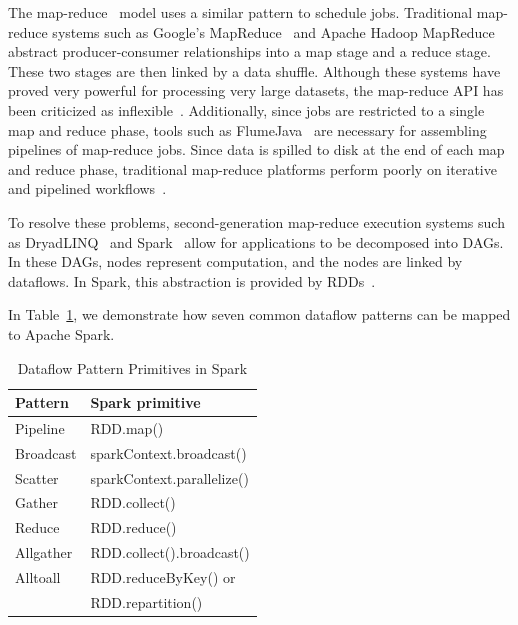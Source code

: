 \documentclass[10pt,journal,compsoc]{IEEEtran}
\begin{document}
The map-reduce~\cite{dean04} model uses a similar pattern to schedule jobs. Traditional map-reduce
systems such as Google's MapReduce~\cite{dean04} and Apache Hadoop MapReduce~\cite{HADOOP} 
abstract producer-consumer relationships into a map stage and a reduce stage. These two stages are then
linked by a data shuffle. Although these systems have proved very powerful for processing very
large datasets, the map-reduce API has been criticized as inflexible~\cite{dewitt08}.
Additionally, since jobs are restricted to a single map and reduce phase, tools such as
FlumeJava~\cite{chambers10} are necessary for assembling pipelines of map-reduce jobs. Since
data is spilled to disk at the end of each map and reduce phase, traditional map-reduce platforms perform poorly
on iterative and pipelined workflows~\cite{zaharia12}.

To resolve these problems, second-generation map-reduce execution systems such as
DryadLINQ~\cite{yu08} and Spark~\cite{zaharia12} allow for applications to be decomposed into
DAGs. In these DAGs, nodes represent computation, and the nodes are
linked by dataflows. In Spark, this abstraction is provided by RDDs~\cite{zaharia12}.

In Table~\ref{tb:Patterns}, we demonstrate how seven common dataflow patterns can be mapped
to Apache Spark.

\begin{table}[h]
  \begin{center}
  \caption{Dataflow Pattern Primitives in Spark}
    \begin{small}
    \begin{tabular}{ | p{1.8cm} | p{5.5cm} |}
    \hline
    Pattern & Spark primitive \\
    \hline \hline
    Pipeline & RDD.map()  \\ 
    Broadcast & sparkContext.broadcast() \\   
    Scatter & sparkContext.parallelize() \\ 
    Gather & RDD.collect() \\ 
    Reduce & RDD.reduce() \\ 
    Allgather & RDD.collect().broadcast() \\ 
    Alltoall & RDD.reduceByKey() or \\
 & RDD.repartition() \\ 
    \hline
    \end{tabular}
    \end{small}   
  \label{tb:Patterns}     	
  \end{center}
\end{table}
\end{document}
